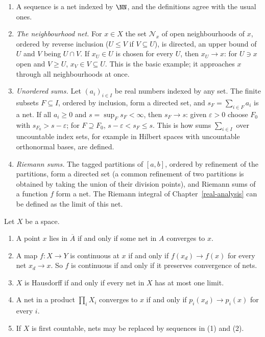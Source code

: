 \begin{example}\label{general-topology:example-nets}
\begin{enumerate}
\item A sequence is a net indexed by $\NN$, and the definitions agree with the usual ones.
\item \emph{The neighbourhood net.} For $x \in X$ the set $\mathcal{N}_x$ of open neighbourhoods of $x$, ordered by reverse inclusion ($U \leq V$ if $V \subseteq U$), is directed, an upper bound of
$U$ and $V$ being $U \cap V$. If $x_U \in U$ is chosen for every $U$, then $x_U \to x$: for $U \ni x$ open and $V \geq U$, $x_V \in V \subseteq U$. This is the basic example; it approaches $x$
through all neighbourhoods at once.
\item \emph{Unordered sums.} Let $(a_i)_{i \in I}$ be real numbers indexed by any set. The finite subsets $F \subseteq I$, ordered by inclusion, form a directed set, and $s_F = \sum_{i \in F}a_i$ is a
net. If all $a_i \geq 0$ and $s = \sup_Fs_F < \infty$, then $s_F \to s$: given $\varepsilon > 0$ choose $F_0$ with $s_{F_0} > s - \varepsilon$; for $F \supseteq F_0$, $s - \varepsilon < s_F \leq s$. This is how
sums $\sum_{i \in I}$ over uncountable index sets, for example in Hilbert spaces with uncountable orthonormal bases, are defined.
\item \emph{Riemann sums.} The tagged partitions of $[a, b]$, ordered by refinement of the partitions, form a directed set (a common refinement of two partitions is obtained by taking the union of their
division points), and Riemann sums of a function $f$ form a net. The Riemann integral of Chapter~\ref{real-analysis} can be defined as the limit of this net.
\end{enumerate}
\end{example}

\begin{proposition}\label{general-topology:proposition-nets}
Let $X$ be a space.
\begin{enumerate}
\item A point $x$ lies in $\overline{A}$ if and only if some net in $A$ converges to $x$.
\item A map $f \colon X \to Y$ is continuous at $x$ if and only if $f(x_d) \to f(x)$ for every net $x_d \to x$. So $f$ is continuous if and only if it preserves convergence of nets.
\item $X$ is Hausdorff if and only if every net in $X$ has at most one limit.
\item A net in a product $\prod_iX_i$ converges to $x$ if and only if $p_i(x_d) \to p_i(x)$ for every $i$.
\item If $X$ is first countable, nets may be replaced by sequences in (1) and (2).
\end{enumerate}
\end{proposition}

